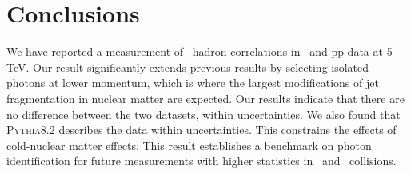 \section{Conclusions}
\label{sec:Conclusions}
We have reported a measurement of \gammaiso--hadron correlations in \pPb~and pp data at {5 TeV}. Our result significantly extends previous results by selecting isolated photons at lower momentum,  which is where the largest modifications of jet fragmentation in nuclear matter are expected. Our results indicate that there are no difference between the two datasets, within uncertainties. We also found that \textsc{Pythia8.2} describes the data within uncertainties. This constrains the effects of cold-nuclear matter effects. This result establishes a benchmark on photon identification for future measurements with higher statistics in \pPb~and \PbPb~collisions. 